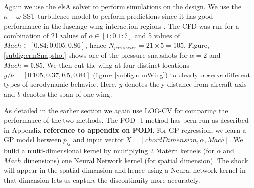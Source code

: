 Again we use the elsA\textsuperscript{\textregistered} solver to perform simulations on the design. We use the $\kappa - \omega$ SST turbulence model to perform predictions since it has good performance in the fuselage wing interaction regions \cite{menter2003ten, vassberg2014summary}. The CFD was run for a combination of 21 values of $\alpha \in [1: 0.1: 3]$ and 5 values of $Mach \in [0.84: 0.005: 0.86]$, hence $N_{parameter} = 21\times5 = 105$. Figure, \ref{subfig:crmSnapshot} shows one of the pressure snapshots for $\alpha = 2$ and $Mach = 0.85$. We then cut the wing at four distinct locations $y/b = [0.105, 0.37, 0.5, 0.84]$ (figure \ref{subfig:crmWing}) to clearly observe different types of aerodynamic behavior. Here, $y$ denotes the y-distance from aircraft axis and $b$ denotes the span of one wing. 

As detailed in the earlier section we again use LOO-CV for comparing the performance of the two methods. The POD+I method has been run as described in Appendix \textbf{reference to appendix on PODi}. For GP regression, we learn a GP model between $p_{ij}$ and input vector $X = [chordDimension, \alpha, Mach]$. We build a multi-dimensional kernel by multiplying 2 Mat\'ern kernels (for $\alpha$ and $Mach$ dimensions) one Neural Network kernel (for spatial dimension). The shock will appear in the spatial dimension and hence using a Neural network kernel in that dimension lets us capture the discontinuity more accurately. 

